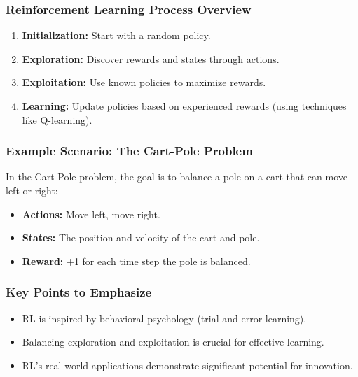 \documentclass{beamer}
\begin{document}
\begin{frame}[fragile]
    \frametitle{Reinforcement Learning Process Overview}
    \begin{enumerate}
        \item \textbf{Initialization:} Start with a random policy.
        \item \textbf{Exploration:} Discover rewards and states through actions.
        \item \textbf{Exploitation:} Use known policies to maximize rewards.
        \item \textbf{Learning:} Update policies based on experienced rewards (using techniques like Q-learning).
    \end{enumerate}
\end{frame}

\begin{frame}[fragile]
    \frametitle{Example Scenario: The Cart-Pole Problem}
    In the Cart-Pole problem, the goal is to balance a pole on a cart that can move left or right:
    \begin{itemize}
        \item \textbf{Actions:} Move left, move right.
        \item \textbf{States:} The position and velocity of the cart and pole.
        \item \textbf{Reward:} +1 for each time step the pole is balanced.
    \end{itemize}
\end{frame}

\begin{frame}[fragile]
    \frametitle{Key Points to Emphasize}
    \begin{itemize}
        \item RL is inspired by behavioral psychology (trial-and-error learning).
        \item Balancing exploration and exploitation is crucial for effective learning.
        \item RL's real-world applications demonstrate significant potential for innovation.
    \end{itemize}
\end{frame}
\end{document}
